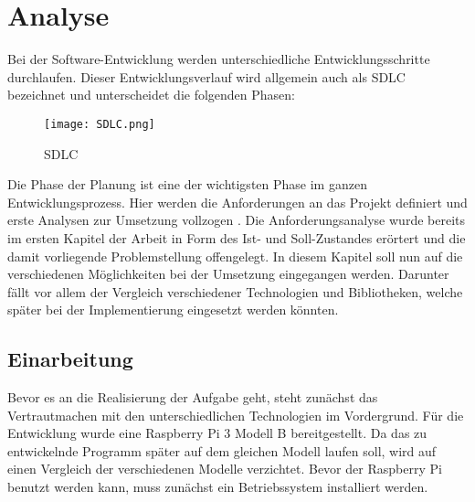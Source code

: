 
\chapter{Analyse}
Bei der Software-Entwicklung werden unterschiedliche Entwicklungsschritte
durchlaufen. Dieser Entwicklungsverlauf wird allgemein auch als \ac{SDLC} bezeichnet
und unterscheidet die folgenden Phasen:
\begin{figure}[h]
    \centering
    \texttt{[image: SDLC.png]}
    \caption{\acl{SDLC}}
\end{figure}

\begin{comment}
\item Planung
\item Implementierung
\item Testung
\item Dokumentation
\item Deployment
\item Wartung
\end{comment}

Die Phase der Planung ist eine der wichtigsten Phase im ganzen
Entwicklungsprozess. Hier werden die Anforderungen an das Projekt definiert 
und erste Analysen zur Umsetzung vollzogen \autocite{SDLC_2019}. Die
Anforderungsanalyse wurde bereits im ersten Kapitel der Arbeit in Form des Ist-
und Soll-Zustandes erörtert und die damit vorliegende Problemstellung
offengelegt. \newline 
In diesem Kapitel soll nun auf die verschiedenen
Möglichkeiten bei der Umsetzung eingegangen werden. Darunter fällt vor allem
der Vergleich verschiedener Technologien und Bibliotheken, welche später bei
der Implementierung eingesetzt werden könnten. 


\section{Einarbeitung}
Bevor es an die Realisierung der Aufgabe geht, steht zunächst das
Vertrautmachen mit den unterschiedlichen Technologien im Vordergrund. Für die
Entwicklung wurde eine Raspberry Pi 3 Modell B bereitgestellt. Da das zu
entwickelnde Programm später auf dem gleichen Modell laufen soll, wird auf
einen Vergleich der verschiedenen Modelle verzichtet. Bevor der Raspberry Pi
benutzt werden kann, muss zunächst ein Betriebssystem installiert werden.
\hfill \break

